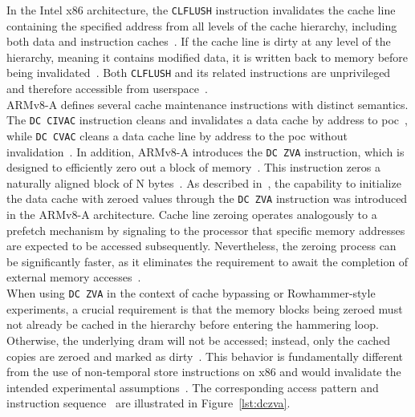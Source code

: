         In the Intel x86 architecture, the \texttt{CLFLUSH} instruction invalidates the cache line containing the 
        specified address from all levels of the cache hierarchy, including both data and instruction caches~\cite{thesisCacheAttacksandRH}. 
        If the cache line is dirty at any level of the hierarchy, meaning it contains modified data, it is written 
        back to memory before being invalidated~\cite{docCLFLUSH, datasheetIntelReferenceManual, thesisCacheAttacksandRH}. Both \texttt{CLFLUSH} and 
        its related instructions are unprivileged and therefore accessible from userspace~\cite{datasheetIntelReferenceManual, thesisCacheAttacksandRH}.
        \\
        ARMv8-A defines several cache maintenance instructions with distinct semantics. The \texttt{DC CIVAC} 
        instruction cleans and invalidates a data cache by address to \gls{poc}~\cite{docDCCIVAC}, while \texttt{DC CVAC} 
        cleans a data cache line by address to the \gls{poc} without invalidation~\cite{docDCCVAC}.
        In addition, ARMv8-A introduces the \texttt{DC ZVA} instruction, which 
        is designed to efficiently zero out a block of memory~\cite{paperTriggeringRHHardwareFault}. This instruction zeros a 
        naturally aligned block of N bytes~\cite{docDCZID}. As described in~\cite{paperRHonRi3B+}, 
        the capability to initialize the data cache with zeroed values through the \texttt{DC ZVA} instruction 
        was introduced in the ARMv8-A architecture. Cache line zeroing operates analogously to a prefetch 
        mechanism by signaling to the processor that specific memory addresses are expected to be accessed 
        subsequently. Nevertheless, the zeroing process can be significantly faster, as it eliminates the 
        requirement to await the completion of external memory accesses~\cite{paperTriggeringRHHardwareFault}.
        \\
        When using \texttt{DC ZVA} in the context of cache bypassing or Rowhammer-style experiments, a crucial requirement 
        is that the memory blocks being zeroed must not already be cached in the hierarchy before entering the 
        hammering loop. Otherwise, the underlying \gls{dram} will not be accessed; instead, only the cached copies 
        are zeroed and marked as dirty~\cite{paperTriggeringRHHardwareFault}. This behavior is fundamentally different from the use of non-temporal 
        store instructions on x86 and would invalidate the intended experimental assumptions~\cite{paperTriggeringRHHardwareFault}.
        The corresponding access pattern and instruction sequence~\cite{paperTriggeringRHHardwareFault} are illustrated in Figure~\ref{lst:dczva}.
        
    
